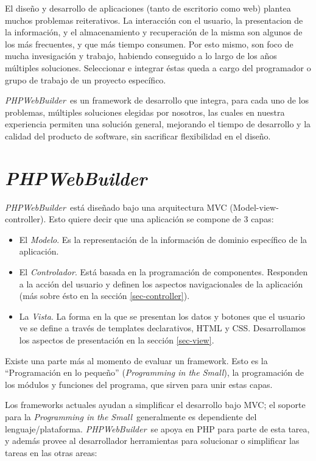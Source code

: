 \documentclass[a4paper,10pt]{article}
\newcommand{\PITS}{\emph{Programming in the Small}} %
\newcommand{\PWB}{\emph{PHPWebBuilder}}
\begin{document}
El diseño y desarrollo de aplicaciones (tanto de escritorio como web) plantea muchos problemas reiterativos. La interacción con el usuario, la presentacion de la información, y el almacenamiento y recuperación de la misma son algunos de los más frecuentes, y que más tiempo consumen.
Por esto mismo, son foco de mucha invesigación y trabajo, habiendo conseguido a lo largo de los años múltiples soluciones. Seleccionar e integrar éstas queda a cargo del programador o grupo de trabajo de un proyecto específico.

\PWB \ es un framework de desarrollo que integra, para cada uno de los problemas, múltiples soluciones elegidas por nosotros, las cuales en nuestra experiencia permiten una solución general, mejorando el tiempo de desarrollo y la calidad del producto de software, sin sacrificar flexibilidad en el diseño.

\section{\PWB}

\PWB \ está diseñado bajo una arquitectura MVC (Model-view-controller)\cite{mvc}.
Esto quiere decir que una aplicación se compone de 3 capas:
\begin{itemize}
\item El \emph{Modelo}. Es la representación de la información de dominio específico de la aplicación.
\item El \emph{Controlador}. Está basada en la programación de componentes. Responden a la acción del usuario y definen los aspectos navigacionales de la aplicación (más sobre ésto en la sección \ref{sec-controller}).
\item La \emph{Vista}. La forma en la que se presentan los datos y botones que el usuario ve se define a través de templates declarativos, HTML y CSS. Desarrollamos los aspectos de presentación en la sección \ref{sec-view}.
\end{itemize}

Existe una parte más al momento de evaluar un framework. Esto es la ``Programación en lo pequeño'' (\PITS), la programación de los módulos y funciones del programa, que sirven para unir estas capas.

Los frameworks actuales ayudan a simplificar el desarrollo bajo MVC; el soporte para la \PITS \ generalmente es dependiente del lenguaje/plataforma. \PWB \ se apoya en PHP para parte de esta tarea, y además provee al desarrollador herramientas para solucionar o simplificar las tareas en las otras areas:
\end{document}
